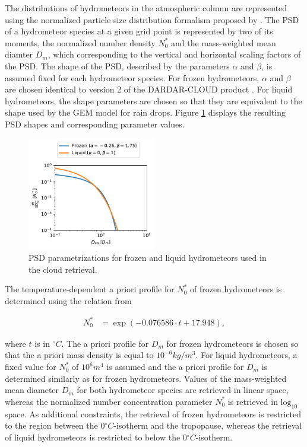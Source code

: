 \documentclass[journal abbreviation, manuscript]{copernicus}
\begin{document}
The distributions of hydrometeors in the atmospheric column are represented
using the normalized particle size distribution formalism proposed by
\cite{delanoe05}. The PSD of a hydrometeor species at a given grid point is
represented by two of its moments, the normalized number density $N_0^*$ and
the mass-weighted mean diamter $D_m$, which corresponding to the vertical and
horizontal scaling factors of the PSD. The shape of the PSD, described by
the parameters $\alpha$ and $\beta$, is assumed fixed for each
hydrometeor species. For frozen hydrometeors, $\alpha$ and $\beta$ are chosen
identical to version 2 of the DARDAR-CLOUD product \citep{cazenave18}. For
liquid hydrometeors, the shape parameters are chosen so that they are
equivalent to the shape used by the GEM model for rain drops. Figure
\ref{fig:psds_retrieval} displays the resulting PSD shapes and corresponding
parameter values.

\begin{figure}
\centering
\includegraphics[width = 0.5\textwidth]{../plots/psds_retrieval}
\caption{PSD parametrizations for frozen and liquid hydrometeors
 used in the cloud retrieval.}
\label{fig:psds_retrieval}
\end{figure}

The temperature-dependent a priori profile for $N_0^*$ of frozen
hydrometeors is determined using the relation from \cite{delanoe14}

\begin{align}
N_0^* &= \exp (-0.076586 \cdot t + 17.948),
\end{align}

where $t$ is in $\unit{^\circ C}$. The a priori profile for $D_m$ for frozen
hydrometeors is chosen so that the a priori mass density is equal to
$10^{-6} \unit{kg/m^3}$. For liquid hydrometeors, a
fixed value for $N_0^*$ of $10^6\unit{m^4}$ is assumed and the
a priori profile for $D_m$ is determined similarly as for frozen
hydrometeors. Values of the mass-weighted mean diameter $D_m$ for both
hydrometeor species are retrieved in linear space, whereas the normalized
number concentration parameter $N_0^*$ is retrieved in $\text{log}_{10}$
space. As additional constraints, the retrieval of frozen hydrometeors is
restricted to the region between the $0\unit{^\circ C}$-isotherm and
the tropopause, whereas the retrieval of liquid hydrometeors is restricted 
to below the $0\unit{^\circ C}$-isotherm.
\end{document}
